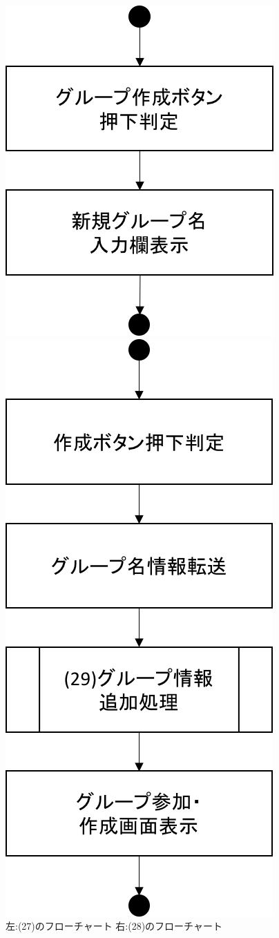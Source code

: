 \begin{figure}[htbp]
 \begin{minipage}{0.5\hsize}
  \begin{center}
   \includegraphics[width=0.5\linewidth,clip]{./img/flow/27.png}
  \end{center}
 \end{minipage}
 \begin{minipage}{0.5\hsize}
  \begin{center}
   \includegraphics[width=0.5\linewidth,clip]{./img/flow/28.png}
  \end{center}
 \end{minipage}
 \caption{左:(27)のフローチャート 右:(28)のフローチャート}\label{fig:27to28}
\end{figure}

